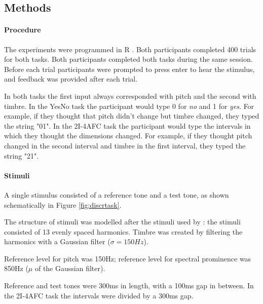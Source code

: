 \documentclass{article}\usepackage{knitr}
\begin{document}
\subsection{Methods}

\paragraph{Procedure}

The experiments were programmed in R \citep{r_language}. Both participants completed 400 trials for both tasks. Both participants completed both tasks during the same session.   Before each trial participants were prompted to press enter to hear the stimulus, and feedback was provided after each trial.

In both tasks the first input always corresponded with pitch and the second with timbre. In the YesNo task the participant would type 0 for \textit{no} and 1 for \textit{yes}. For example, if they thought that pitch didn't change but timbre changed, they typed the string "01". In the 2I-4AFC task the participant would type the intervals in which they thought the dimensions changed. For example, if they thought pitch changed in the second interval and timbre in the first interval, they typed the string "21". 

\paragraph{Stimuli}

A single stimulus consisted of a reference tone and a test tone, as shown schematically in Figure \ref{fig:discrtask}. 

The structure of stimuli was modelled after the stimuli used by \citet{silbert2009}: the stimuli consisted of 13 evenly spaced harmonics. Timbre was created by filtering the harmonics with a Gaussian filter ($\sigma = 150Hz$).

Reference level for pitch was 150Hz; reference level for spectral prominence was 850Hz ($\mu$ of the Gaussian filter).

Reference and test tones were 300ms in length, with a 100ms gap in between. In the 2I-4AFC task the intervals were divided by a 300ms gap.
\end{document}
